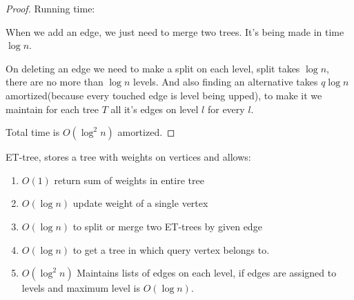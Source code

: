 \begin{proof}
Running time:

When we add an edge, we just need to merge two trees. It's being made in time $\log n$.

On deleting an edge we need to make a split on each level, split takes $\log n$, there are no more than $\log n$ levels. And also finding an alternative takes $q \log n$ amortized(because every touched edge is level being upped), to make it we maintain for each tree $T$ all it's edges on level $l$ for every $l$.

Total time is $O(\log^2 n)$ amortized.
\end{proof}

\begin{df}[ET-tree] \label{df:et_tree}
  ET-tree, stores a tree with weights on vertices and allows:
  \begin{enumerate}
	  \item $O(1)$ return sum of weights in entire tree
	\item $O(\log n)$ update weight of a single vertex
	\item $O(\log n)$ to split or merge two ET-trees by given edge
	\item $O(\log n)$ to get a tree in which query vertex belongs to.
	\item $O(\log^2 n)$ Maintains lists of edges on each level, if edges are assigned to levels and maximum level is $O(\log n)$.
  \end{enumerate}
\end{df}

